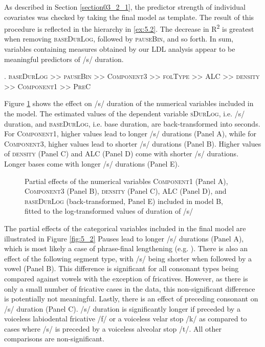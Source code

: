 As described in Section \ref{section03_2_1}, the predictor strength of individual covariates was checked by taking the final model as template. The result of this procedure is reflected in the hierarchy in \ref{ex:5.2}. The decrease in R\textsuperscript{2} is greatest when removing \textsc{baseDurLog}, followed by \textsc{pauseBin}, and so forth. In sum, variables containing measures obtained by our LDL analysis appear to be meaningful predictors of /s/ duration.

\ex.
\label{ex:5.2}
\textsc{baseDurLog >> pauseBin >> Component3 >> folType >> ALC >> density >> Component1 >> PreC}

Figure \ref{fig:5_1} shows the effect on /s/ duration of the numerical variables included in the model. The estimated values of the dependent variable \textsc{sDurLog}, i.e. /s/ duration, and \textsc{baseDurLog}, i.e. base duration, are back-transformed into seconds. For \textsc{Component1}, higher values lead to longer /s/ durations (Panel A), while for \textsc{Component3}, higher values lead to shorter /s/ durations (Panel B). Higher values of \textsc{density} (Panel C) and \textsc{ALC} (Panel D) come with shorter /s/ durations. Longer bases come with longer /s/ durations (Panel E).

\begin{figure}
    \centering
    
    \caption{Partial effects of the numerical variables \textsc{Component1} (Panel A), \textsc{Component3} (Panel B), \textsc{density} (Panel C), \textsc{ALC} (Panel D), and \textsc{baseDurLog} (back-transformed, Panel E) included in model B, fitted to the log-transformed values of duration of /s/}
    \label{fig:5_1}
\end{figure}

The partial effects of the categorical variables included in the final model are illustrated in Figure \ref{fig:5_2} Pauses lead to longer /s/ durations (Panel A), which is most likely a case of phrase-final lengthening (e.g. \cite{Cooper1981}). There is also an effect of the following segment type, with /s/ being shorter when followed by a vowel (Panel B). This difference is significant for all consonant types being compared against vowels with the exception of fricatives. However, as there is only a small number of fricative cases in the data, this non-significant difference is potentially not meaningful. Lastly, there is an effect of preceding consonant on /s/ duration (Panel C). /s/ duration is significantly longer if preceded by a voiceless labiodental fricative /f/ or a voiceless velar stop /k/ as compared to cases where /s/ is preceded by a voiceless alveolar stop /t/. All other comparisons are non-significant.

